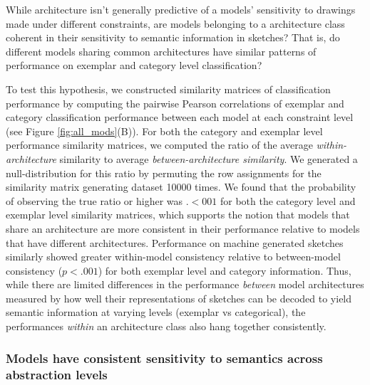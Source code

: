 \documentclass[10pt,letterpaper]{article}
\begin{document}
While architecture isn't generally predictive of a models' sensitivity to drawings made under different constraints, are models belonging to a architecture class coherent in their sensitivity to semantic information in sketches? That is, do different models sharing common architectures have similar patterns of performance on exemplar and category level classification?

To test this hypothesis, we constructed similarity matrices of classification performance by computing the pairwise Pearson correlations of exemplar and category classification performance between each model at each constraint level (see Figure \ref{fig:all_mods}(B)).
For both the category and exemplar level performance similarity matrices, we computed the ratio of the average \textit{within-architecture} similarity to average \textit{between-architecture similarity}. We generated a null-distribution for this ratio by permuting the row assignments for the similarity matrix generating dataset 10000 times. We found that the probability of observing the true ratio or higher was $.<001$ for both the category level and exemplar level similarity matrices, which supports the notion that models that share an architecture are more consistent in their performance relative to models that have different architectures. Performance on machine generated sketches similarly showed greater within-model consistency relative to between-model consistency ($p<.001$) for both exemplar level and category information.
Thus, while there are limited differences in the performance \textit{between} model architectures measured by how well their representations of sketches can be decoded to yield semantic information at varying levels (exemplar vs categorical), the performances \textit{within} an architecture class also hang together consistently.

\subsubsection{Models have consistent sensitivity to semantics across abstraction levels}
\end{document}
